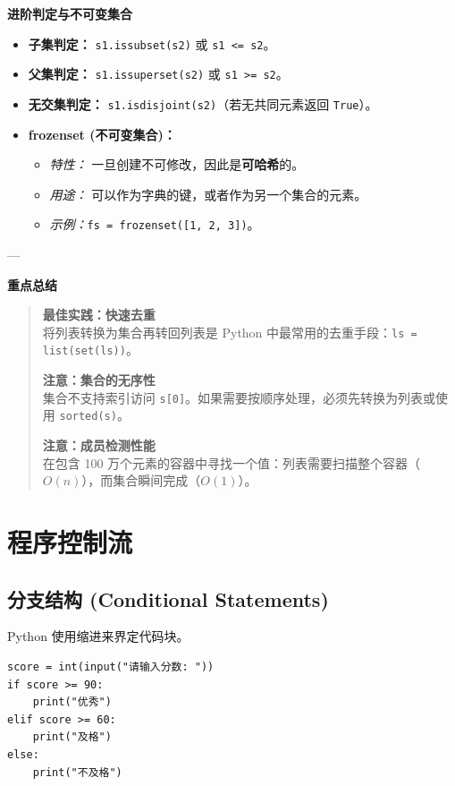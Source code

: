 \documentclass{article}
\begin{document}
\textbf{进阶判定与不可变集合}
\begin{itemize}
    \item \textbf{子集判定：} \texttt{s1.issubset(s2)} 或 \texttt{s1 <= s2}。
    \item \textbf{父集判定：} \texttt{s1.issuperset(s2)} 或 \texttt{s1 >= s2}。
    \item \textbf{无交集判定：} \texttt{s1.isdisjoint(s2)}（若无共同元素返回 \texttt{True}）。
    \item \textbf{frozenset (不可变集合)：}
    \begin{itemize}
        \item \textit{特性：} 一旦创建不可修改，因此是\textbf{可哈希}的。
        \item \textit{用途：} 可以作为字典的键，或者作为另一个集合的元素。
        \item \textit{示例：}\texttt{fs = frozenset([1, 2, 3])}。
    \end{itemize}
\end{itemize}

---

\textbf{重点总结}
\begin{quote}
\textbf{最佳实践：快速去重} \\
将列表转换为集合再转回列表是 Python 中最常用的去重手段：\texttt{ls = list(set(ls))}。

\textbf{注意：集合的无序性} \\
集合不支持索引访问 \texttt{s[0]}。如果需要按顺序处理，必须先转换为列表或使用 \texttt{sorted(s)}。

\textbf{注意：成员检测性能} \\
在包含 100 万个元素的容器中寻找一个值：列表需要扫描整个容器（$O(n)$），而集合瞬间完成（$O(1)$）。
\end{quote}
\section{程序控制流}

\subsection{分支结构 (Conditional Statements)}
Python 使用缩进来界定代码块。
\begin{lstlisting}
score = int(input("请输入分数: "))
if score >= 90:
    print("优秀")
elif score >= 60:
    print("及格")
else:
    print("不及格")
\end{lstlisting}
\end{document}
